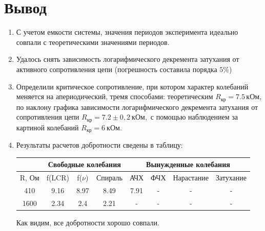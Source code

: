 \documentclass[a4paper,12pt]{article}
\theoremstyle{definition}
\begin{document}
\section{Вывод}
\begin{enumerate}
    \item С учетом емкости системы, значения периодов эксперимента идеально совпали с теоретическими значениями периодов.
    \item Удалось снять зависимость логарифмического декремента затухания от активного сопротивления цепи (погрешность составила порядка $5\%$)
    \item Определили критическое сопротивление, при котором характер колебаний меняется на апериодический, тремя способами: теоретическим $R_{кр} = 7.5$\,кОм, по наклону графика зависимости логарифмического декремента затухания от сопротивления цепи $R_\text{кр} = 7.2 \pm 0,2 \ \text{кОм},$ с помощью наблюдением за картиной колебаний $R_\text{кр} = 6 \ \text{кОм}.$ 
    \item Результаты расчетов добротности сведены в таблицу: \\
    \begin{center}
        \begin{tabular}{|c|c|c|c|c|c|c|c|} \hline
             &\multicolumn{3}{c}{Свободные колебания} &\multicolumn{4}{|c|}{Вынужденные колебания} \\ \hline{}
           R, Ом & f(LCR) & f($\nu$) & Спираль& АЧХ & ФЧХ & Нарастание & Затухание\\ \hline
          410 &9.16 & 8.97& 8.49 & 7.91 & -& -&- \\ \hline
          1600 & 2.34 & 2.4& 2.21 & - & -& -&- \\ \hline
        \end{tabular}
            
    \end{center}

 Как видим, все добротности хорошо совпали.

\end{enumerate}
\end{document}
